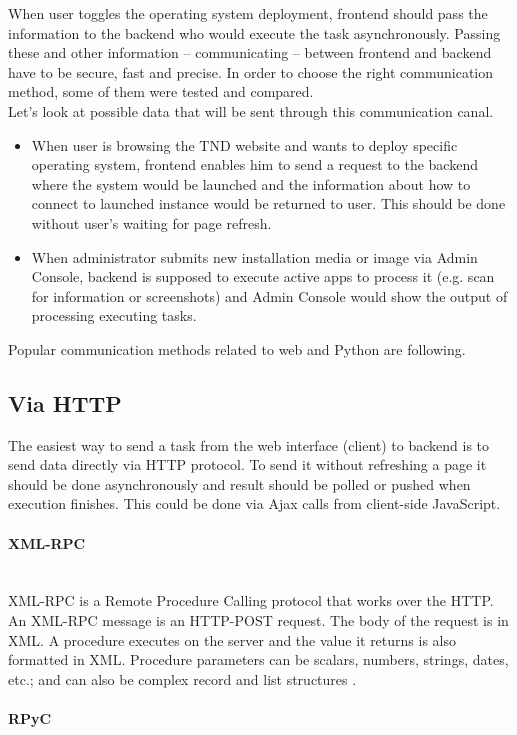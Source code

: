 \documentclass[thesis=B,english]{FITthesis}[2013/04/26]
\newcommand{\myparagraph}[1]{\paragraph{#1}\mbox{}\\}
\begin{document}
When user toggles the operating system deployment, frontend should pass the information to the backend who would execute the task asynchronously. Passing these and other information -- communicating -- between frontend and backend have to be secure, fast and precise. In order to choose the right communication method, some of them were tested and compared. \\

Let's look at possible data that will be sent through this communication canal.

\begin{itemize}
	\item When user is browsing the TND website and wants to deploy specific operating system, frontend enables him to send a request to the backend where the system would be launched and the information about how to connect to launched instance would be returned to user. This should be done without user's waiting for page refresh.
	\item When administrator submits new installation media or image via Admin Console, backend is supposed to execute active apps to process it (e.g. scan for information or screenshots) and Admin Console would show the output of processing executing tasks.
\end{itemize}

Popular communication methods related to web and Python are following.

\subsection{Via HTTP}

The easiest way to send a task from the web interface (client) to backend is to send data directly via HTTP protocol. To send it without refreshing a page it should be done asynchronously and result should be polled or pushed when execution finishes. This could be done via Ajax calls from client-side JavaScript.

\myparagraph{XML-RPC}

XML-RPC is a Remote Procedure Calling protocol that works over the HTTP. An XML-RPC message is an HTTP-POST request. The body of the request is in XML. A procedure executes on the server and the value it returns is also formatted in XML. Procedure parameters can be scalars, numbers, strings, dates, etc.; and can also be complex record and list structures \cite{xmlrpc}.

\myparagraph{RPyC}
\end{document}
